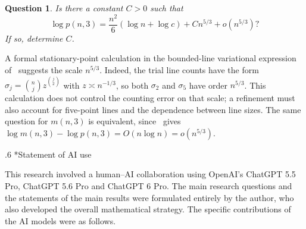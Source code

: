 \documentclass[11pt,reqno]{amsart}
\makeatletter
\numberwithin{equation}{section}
\renewcommand{\section}{\@startsection{section}{1}%
    \z@{1.3\linespacing\@plus.5\linespacing\@minus.2\linespacing}%
    {.6\linespacing}%
    {\normalfont\scshape\centering}}
\theoremstyle{plain}
\newtheorem{question}[theorem]{Question}
\theoremstyle{definition}
\makeatother
\begin{document}
\begin{question}\label{ques:rankthree}
    Is there a constant $C>0$ such that
    \[
        \log p(n,3)=\frac{n^2}{6}(\log n+\log c)+Cn^{5/3}+o(n^{5/3})?
    \]
    If so, determine $C$.
\end{question}

A formal stationary-point calculation in the bounded-line variational expression of~\cite[Lemma~2.2]{KSSMatroids} suggests the scale $n^{5/3}$.
Indeed, the trial line counts have the form $\sigma_j=\binom nj z^{\binom j2}$ with $z\asymp n^{-1/3}$, so both $\sigma_2$ and $\sigma_5$ have order $n^{5/3}$.
This calculation does not control the counting error on that scale; a refinement must also account for five-point lines and the dependence between line sizes.
The same question for $m(n,3)$ is equivalent, since~\cite[Theorem~3]{PvdP} gives $\log m(n,3)-\log p(n,3)=O(n\log n)=o(n^{5/3})$.


\section*{Statement of AI use}

This research involved a human--AI collaboration using OpenAI's
ChatGPT 5.5 Pro, ChatGPT 5.6 Pro and ChatGPT 6 Pro.
The main research questions and the statements of the main results
were formulated entirely by the author, who also developed the
overall mathematical strategy.
The specific contributions of the AI models were as follows.
\end{document}
